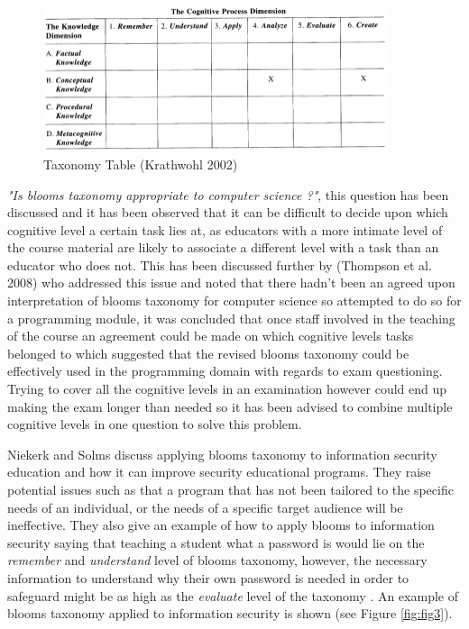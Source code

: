 \documentclass[12pt,a4paper]{article}
\begin{document}
\begin{figure}[h]
    \centering
    \includegraphics[width=0.9\textwidth]{Figs/blooms.PNG} 
    \caption{Taxonomy Table (Krathwohl 2002)}
    \label{fig:fig2}
\end{figure}  

\emph{"Is blooms taxonomy appropriate to computer science ?"}, this question has been discussed \cite{johnson2006bloom} and it has been observed that it can be difficult to decide upon which cognitive level a certain task lies at, as educators with a more intimate level of the course material are likely to associate a different level with a task than an educator who does not. This has been discussed further by (Thompson et al. 2008)\cite{thompson2008bloom} who addressed this issue and noted that there hadn't been an agreed upon interpretation of blooms taxonomy for computer science so attempted to do so for a programming module, it was concluded that once staff involved in the teaching of the course an agreement could be made on which cognitive levels tasks belonged to which suggested that the revised blooms taxonomy could be effectively used in the programming domain with regards to exam questioning. Trying to cover all the cognitive levels in an examination however could end up making the exam longer than needed so it has been advised \cite{scott2003bloom} to combine multiple cognitive levels in one question to solve this problem. 

Niekerk and Solms discuss applying blooms taxonomy to information security education and how it can improve security educational programs. They raise potential issues such as that a program that has not been tailored to the specific needs of an individual, or the needs of a specific target audience will be ineffective. They also give an example of how to apply blooms to information security saying that teaching a student what a password is would lie on the \emph{remember} and \emph{understand} level of blooms taxonomy, however, the necessary information to understand  why their own password is needed in order to safeguard might be as high as the \emph{evaluate} level of the taxonomy \cite{van2009using}. An example of blooms taxonomy applied to information security is shown (see Figure \ref{fig:fig3}).  
\end{document}
